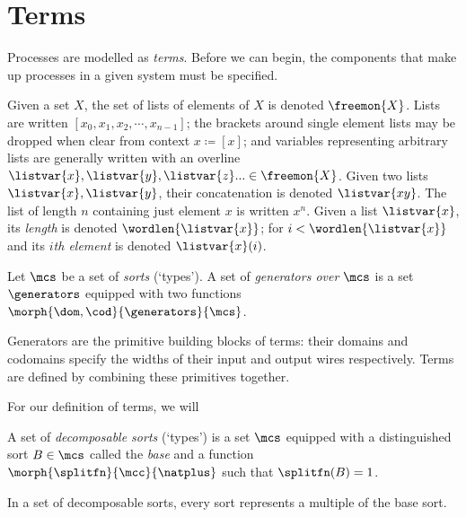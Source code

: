 \section{Terms}

Processes are modelled as \emph{terms}.
Before we can begin, the components that make up processes in a given system
must be specified.

\begin{notation}[Lists]
    Given a set \(X\), the set of lists of elements of \(X\) is denoted
    \(\freemon{X}\).
    Lists are written \([x_0, x_1, x_2, \cdots, x_{n-1}]\); the brackets around
    single element lists may be dropped when clear from context \(x \coloneqq [x]\);
    and variables representing arbitrary lists are generally written with an
    overline \(
        \listvar{x}, \listvar{y}, \listvar{z}... \in \freemon{X}
    \).
    Given two lists \(\listvar{x}, \listvar{y}\), their concatenation is
    denoted \(\listvar{xy}\).
    The list of length \(n\) containing just element \(x\) is written \(x^n\).
    Given a list \(\listvar{x}\), its \emph{length} is denoted
    \(\wordlen{\listvar{x}}\); for \(i < \wordlen{\listvar{x}}\) and its
    \(i\)\emph{th element} is denoted \(\listvar{x}(i)\).
\end{notation}

\begin{definition}[Generators]
    Let \(\mcs\) be a set of \emph{sorts} (`types').
    A set of \emph{generators over} \(\mcs\) is a set \(\generators\)
    equipped with two functions \(\morph{\dom,\cod}{\generators}{\mcs}\).
\end{definition}

Generators are the primitive building blocks of terms: their domains and
codomains specify the widths of their input and output wires respectively.
Terms are defined by combining these primitives together.

For our definition of terms, we will

\begin{definition}
    A set of \emph{decomposable sorts} (`types') is a set \(\mcs\) equipped with
    a distinguished sort \(B \in \mcs\) called the \emph{base} and a function \(
        \morph{\splitfn}{\mcc}{\natplus}
    \) such that \(\splitfn(B) = 1\).
\end{definition}

In a set of decomposable sorts, every sort represents a multiple of the base
sort.


